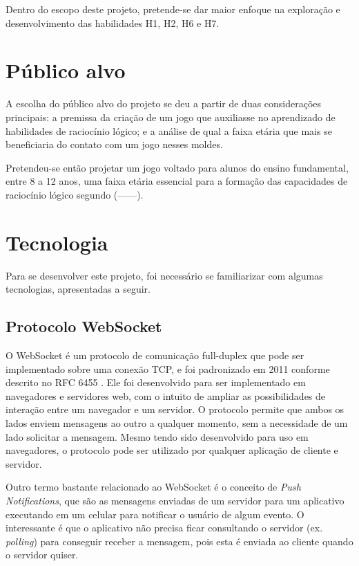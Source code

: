 Dentro do escopo deste projeto, pretende-se dar maior enfoque na exploração e
desenvolvimento das habilidades H1, H2, H6 e H7.


\section{Público alvo}\label{sec-publico-alvo}

A escolha do público alvo do projeto se deu a partir de duas considerações
principais: a premissa da criação de um jogo que auxiliasse no aprendizado 
de habilidades de raciocínio lógico; e a análise de qual a faixa etária que 
mais se beneficiaria do contato com um jogo nesses moldes.

Pretendeu-se então projetar um jogo voltado para alunos do ensino fundamental, 
entre 8 a 12 anos, uma faixa etária essencial para a formação das capacidades 
de raciocínio lógico segundo (------).


\section{Tecnologia}\label{sec-tecnologia}

Para se desenvolver este projeto, foi necessário se familiarizar com algumas tecnologias, apresentadas a seguir. 
\subsection{Protocolo WebSocket}\label{subsec-teo-websocket}

O WebSocket é um protocolo de comunicação full-duplex que pode ser implementado
sobre uma conexão TCP, e foi padronizado em 2011 conforme descrito no RFC 6455
\cite{RFC:2011:websocket}. Ele foi desenvolvido para ser implementado em 
navegadores e servidores web, com o intuito de ampliar as possibilidades de
interação entre um navegador e um servidor. O protocolo permite que ambos os 
lados enviem mensagens ao outro a qualquer momento, sem a necessidade de um 
lado solicitar a mensagem. Mesmo tendo sido desenvolvido para uso em navegadores, 
o protocolo pode ser utilizado por qualquer aplicação de cliente e servidor.

Outro termo bastante relacionado ao WebSocket é o conceito de 
\textit{Push Notifications}, que são as mensagens enviadas de um servidor para 
um aplicativo executando em um celular para notificar o usuário de algum evento. 
O interessante é que o aplicativo não precisa ficar consultando o servidor 
(ex. \textit{polling}) para conseguir receber a mensagem, pois esta é enviada 
ao cliente quando o servidor quiser.

